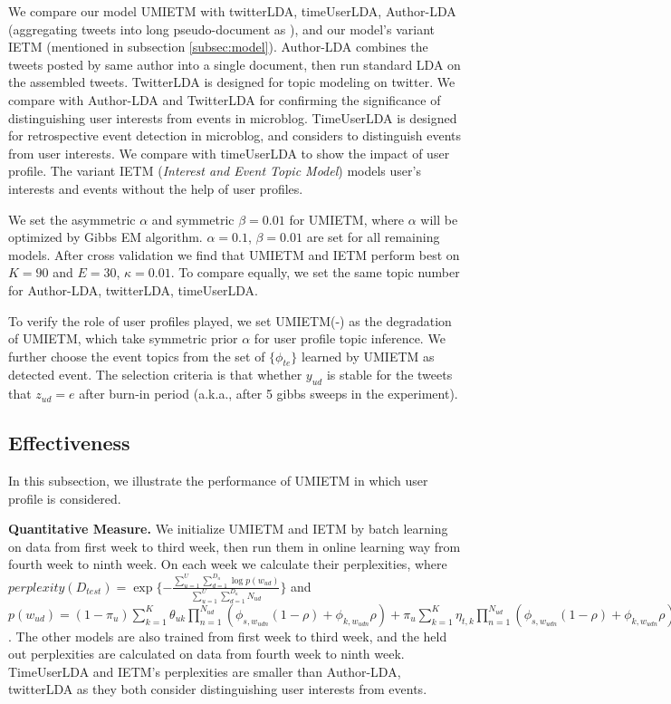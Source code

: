 \documentclass[runningheads,a4paper]{llncs}
\begin{document}
We compare our model UMIETM with twitterLDA\cite{zhao2011twitterLDA}, timeUserLDA\cite{timeUserLDA2012finding}, Author-LDA (aggregating tweets into long pseudo-document as \cite{quan2015short} ), and our model's variant IETM (mentioned in subsection \ref{subsec:model}).
Author-LDA combines the tweets posted by same author into a single document, then run standard LDA on the assembled tweets.
TwitterLDA is designed for topic modeling on twitter.
We compare with Author-LDA and TwitterLDA for confirming the significance of distinguishing user interests from events in microblog.
TimeUserLDA\cite{timeUserLDA2012finding} is designed for retrospective event detection in microblog, and considers to distinguish events from user interests.
We compare with timeUserLDA to show the impact of user profile.
The variant IETM (\textit{Interest and Event Topic Model}) models user's interests and events without the help of user profiles.

We set the asymmetric \(\alpha\) and symmetric \(\beta=0.01\) for UMIETM, where \(\alpha\) will be optimized by Gibbs EM algorithm\cite{wallach2008structured}.
\(\alpha=0.1\), \(\beta=0.01\) are set for all remaining models. 
After cross validation we find that UMIETM and IETM perform best on \(K=90\) and \(E=30\), \(\kappa=0.01\).
To compare equally, we set the same topic number for Author-LDA, twitterLDA, timeUserLDA.

To verify the role of user profiles played, we set UMIETM(-) as the degradation of UMIETM, which take symmetric prior \(\alpha\) for user profile topic inference.
We further choose the event topics from the set of \(\{\phi_{te}\}\) learned by UMIETM as detected event.
The selection criteria is that whether \(y_{ud}\) is stable for the tweets that \(z_{ud}=e\) after burn-in period (a.k.a., after 5 gibbs sweeps in the experiment). 

\subsection{Effectiveness}
In this subsection, we illustrate the performance of UMIETM in which user profile is considered.

\textbf{Quantitative Measure.}
We initialize UMIETM and IETM by batch learning on data from first week to third week, then run them in online learning way from fourth week to ninth week.
On each week we calculate their perplexities\cite{wallach2009evaluation}, where \(perplexity(D_{test})=\exp{\{-\frac{\sum_{u=1}^{U}\sum_{d=1}^{D_u}\log{p(w_{ud})}}{\sum_{u=1}^{U}\sum_{d=1}^{D_u}N_{ud}}\}}\) and \(p(w_{ud})=(1-\pi_u)\sum_{k=1}^{K}\theta_{uk}\prod_{n=1}^{N_{ud}}(\phi_{s,w_{udn}}(1-\rho)+\phi_{k,w_{udn}}\rho)+\pi_u \sum_{k=1}^{K}\eta_{t,k}\prod_{n=1}^{N_{ud}}(\phi_{s,w_{udn}}(1-\rho)+\phi_{k,w_{udn}}\rho)\).
The other models are also trained from first week to third week, and the held out perplexities are calculated on data from fourth week to ninth week.
TimeUserLDA and IETM's perplexities are smaller than Author-LDA, twitterLDA as they both consider distinguishing user interests from events.
\end{document}

